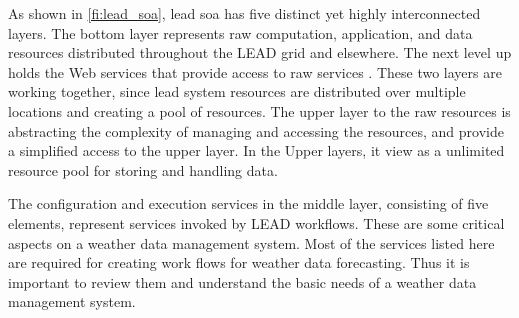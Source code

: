 As shown in \cref{fi:lead_soa}, \acrshort{lead} \acrshort{soa} has five distinct yet highly interconnected layers. 
The bottom layer represents raw computation, application, and data resources distributed throughout the LEAD grid and elsewhere. The next level up holds the Web services that provide access to raw services \cite{Droegemeier2005Service-OrientedWeather}. These two layers are working together, since \acrshort{lead} system resources are distributed over multiple locations and creating a pool of resources. The upper layer to the raw resources is abstracting the complexity of managing and accessing the resources, and provide a simplified access to the upper layer. In the Upper layers, it view as a unlimited resource pool for storing and handling data.

The configuration and execution services in the middle layer, consisting of five elements, represent services invoked by LEAD workflows. These are some critical aspects on a weather data management system. Most of the services listed here are required for creating work flows for weather data forecasting. Thus it is important to review them and understand the basic needs of a weather data management system.

